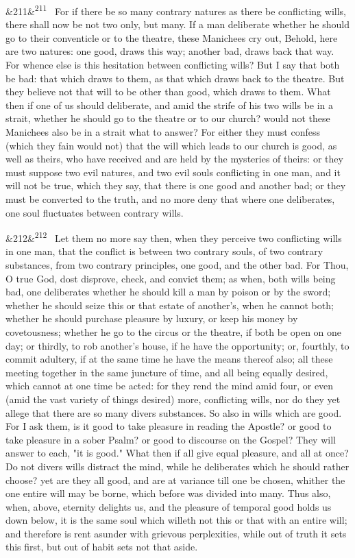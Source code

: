 \documentclass[12pt]{article}
\newcommand{\para}[1][]{\par\noindent\ifx&#1&\else\textsuperscript{\footnotesize #1}~\fi}
\begin{document}
\para[211] For if there be so many contrary natures as there be conflicting wills, there shall now be not two only, but many. If a man deliberate whether he should go to their conventicle or to the theatre, these Manichees cry out, Behold, here are two natures: one good, draws this way; another bad, draws back that way. For whence else is this hesitation between conflicting wills? But I say that both be bad: that which draws to them, as that which draws back to the theatre. But they believe not that will to be other than good, which draws to them. What then if one of us should deliberate, and amid the strife of his two wills be in a strait, whether he should go to the theatre or to our church? would not these Manichees also be in a strait what to answer? For either they must confess (which they fain would not) that the will which leads to our church is good, as well as theirs, who have received and are held by the mysteries of theirs: or they must suppose two evil natures, and two evil souls conflicting in one man, and it will not be true, which they say, that there is one good and another bad; or they must be converted to the truth, and no more deny that where one deliberates, one soul fluctuates between contrary wills.

\para[212] Let them no more say then, when they perceive two conflicting wills in one man, that the conflict is between two contrary souls, of two contrary substances, from two contrary principles, one good, and the other bad. For Thou, O true God, dost disprove, check, and convict them; as when, both wills being bad, one deliberates whether he should kill a man by poison or by the sword; whether he should seize this or that estate of another's, when he cannot both; whether he should purchase pleasure by luxury, or keep his money by covetousness; whether he go to the circus or the theatre, if both be open on one day; or thirdly, to rob another's house, if he have the opportunity; or, fourthly, to commit adultery, if at the same time he have the means thereof also; all these meeting together in the same juncture of time, and all being equally desired, which cannot at one time be acted: for they rend the mind amid four, or even (amid the vast variety of things desired) more, conflicting wills, nor do they yet allege that there are so many divers substances. So also in wills which are good. For I ask them, is it good to take pleasure in reading the Apostle? or good to take pleasure in a sober Psalm? or good to discourse on the Gospel? They will answer to each, "it is good." What then if all give equal pleasure, and all at once? Do not divers wills distract the mind, while he deliberates which he should rather choose? yet are they all good, and are at variance till one be chosen, whither the one entire will may be borne, which before was divided into many. Thus also, when, above, eternity delights us, and the pleasure of temporal good holds us down below, it is the same soul which willeth not this or that with an entire will; and therefore is rent asunder with grievous perplexities, while out of truth it sets this first, but out of habit sets not that aside.
\end{document}
